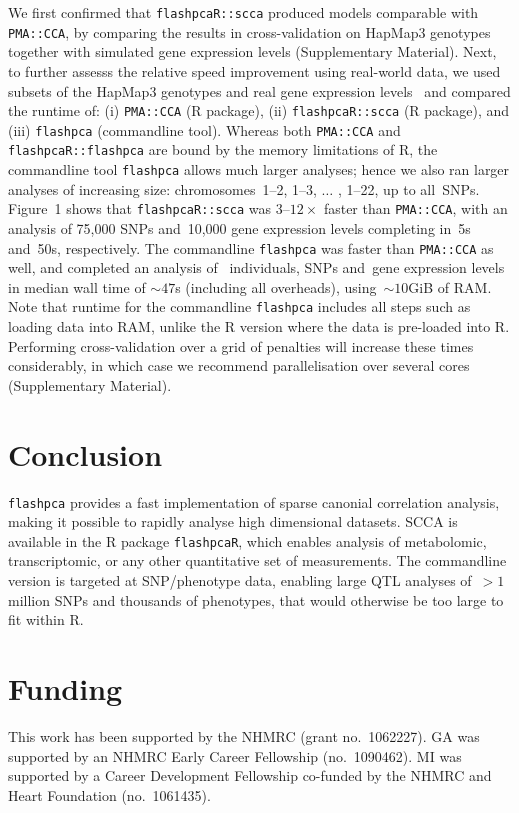 We first confirmed that \texttt{flashpcaR::scca} produced models comparable
with \texttt{PMA::CCA}, by comparing the results in cross-validation on HapMap3
genotypes together with simulated gene expression levels (Supplementary
Material).  Next, to further assesss the relative speed improvement using
real-world data, we used subsets of the HapMap3 genotypes and real gene
expression levels~\citep{Stranger2012} and compared the runtime of: (i)
\texttt{PMA::CCA} (\textsf{R} package), (ii) \texttt{flashpcaR::scca}
(\textsf{R} package), and (iii) \texttt{flashpca} (commandline tool).
Whereas both \texttt{PMA::CCA} and \texttt{flashpcaR::flashpca} are bound by
the memory limitations of \textsf{R}, the commandline tool \texttt{flashpca}
allows much larger analyses; hence we also ran larger analyses of increasing
size: chromosomes~1--2, 1--3, $\hdots$ , 1--22, up to all~\nsnps SNPs.
Figure~1\vphantom{\ref{fig:01}} shows that \texttt{flashpcaR::scca} was
$3\text{--}12\times$ faster than \texttt{PMA::CCA}, with an analysis
of 75,000 SNPs and~10,000 gene expression levels completing in~5s
and~50s, respectively. The commandline \texttt{flashpca} was faster
than \texttt{PMA::CCA} as well, and completed an analysis of~\nindiv
individuals, \nsnps SNPs and~\ngenes gene expression levels in median wall
time of ${\sim}47$s (including all overheads), using~${\sim}10$GiB of RAM.
Note that runtime for the commandline \texttt{flashpca} includes all steps
such as loading data into RAM, unlike the \textsf{R} version where the data
is pre-loaded into \textsf{R}.  Performing cross-validation over a grid of
penalties will increase these times considerably, in which case we recommend
parallelisation over several cores (Supplementary Material).\vspace*{-12pt}

\section{Conclusion}

\texttt{flashpca} provides a fast implementation of sparse canonial correlation
analysis, making it possible to rapidly analyse high dimensional datasets.
SCCA is available in the \textsf{R} package \texttt{flashpcaR}, which enables
analysis of metabolomic, transcriptomic, or any other quantitative set of
measurements. The commandline version is targeted at SNP/phenotype data,
enabling large QTL analyses of~${>}1$ million SNPs and thousands of phenotypes,
that would otherwise be too large to fit within \textsf{R}.\vspace*{-12pt}

\section*{Funding}

This work has been supported by the NHMRC (grant no.~1062227). GA was supported
by an NHMRC Early Career Fellowship (no.~1090462). MI was supported by a
Career Development Fellowship co-funded by the NHMRC and Heart Foundation
(no.~1061435).\vspace*{-12pt}

%
%

%

